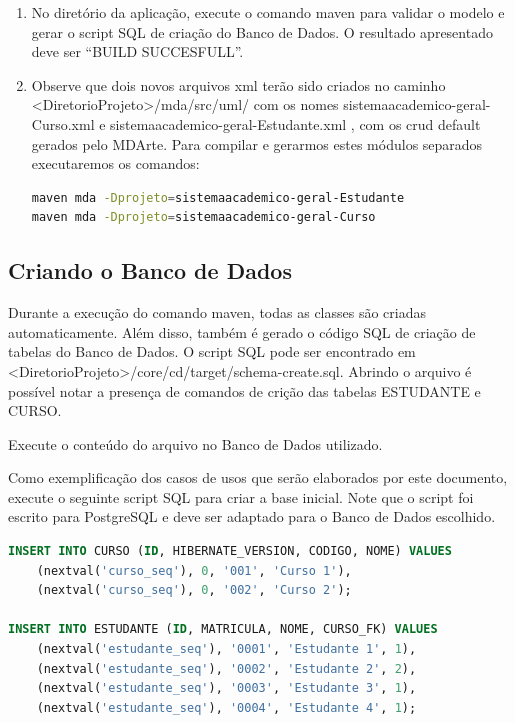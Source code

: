 \begin{enumerate}
\item No diretório da aplicação, execute o comando maven para validar o modelo
e gerar o script SQL de criação do Banco de Dados. O resultado apresentado deve
ser “BUILD SUCCESFULL”. 
	
\item Observe que dois novos arquivos xml terão sido criados no caminho
<DiretorioProjeto>/mda/src/uml/ com os nomes sistemaacademico-geral-Curso.xml e
sistemaacademico-geral-Estudante.xml , com os crud default gerados pelo MDArte.
Para compilar e gerarmos estes módulos separados executaremos os comandos:
	
\begin{lstlisting}[language=bash]
maven mda -Dprojeto=sistemaacademico-geral-Estudante
maven mda -Dprojeto=sistemaacademico-geral-Curso
\end{lstlisting}

\end{enumerate}

\subsection{Criando o Banco de Dados}

Durante a execução do comando maven, todas as classes são criadas automaticamente.
Além disso, também é gerado o código SQL de criação de tabelas do Banco de Dados. O script
SQL pode ser encontrado em <DiretorioProjeto>/core/cd/target/schema-create.sql. Abrindo o
arquivo é possível notar a presença de comandos de crição das tabelas ESTUDANTE e CURSO.

Execute o conteúdo do arquivo no Banco de Dados utilizado.

Como exemplificação dos casos de usos que serão elaborados por este documento, execute o
seguinte script SQL para criar a base inicial. Note que o script foi escrito
para PostgreSQL e deve ser adaptado para o Banco de Dados escolhido.

\begin{lstlisting}[language=sql]
INSERT INTO CURSO (ID, HIBERNATE_VERSION, CODIGO, NOME) VALUES
	(nextval('curso_seq'), 0, '001', 'Curso 1'),
	(nextval('curso_seq'), 0, '002', 'Curso 2');

INSERT INTO ESTUDANTE (ID, MATRICULA, NOME, CURSO_FK) VALUES
	(nextval('estudante_seq'), '0001', 'Estudante 1', 1),
	(nextval('estudante_seq'), '0002', 'Estudante 2', 2),
	(nextval('estudante_seq'), '0003', 'Estudante 3', 1),
	(nextval('estudante_seq'), '0004', 'Estudante 4', 1);
\end{lstlisting}

